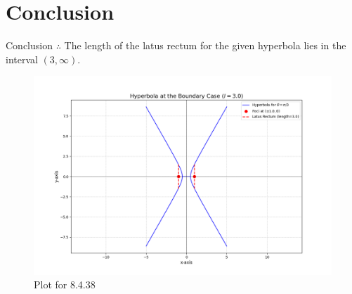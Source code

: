 \documentclass{beamer}
\theoremstyle{remark}
\begin{document}
\section{Conclusion}
\begin{frame}{Conclusion}
$\therefore$ The length of the latus rectum for the given hyperbola lies in the interval $(3,\infty)$.

\begin{figure}[H]
    \centering
    \includegraphics[width=0.60\columnwidth]{figs/1.png}
    \caption{Plot for 8.4.38}
\end{figure}
\end{frame}
\end{document}
